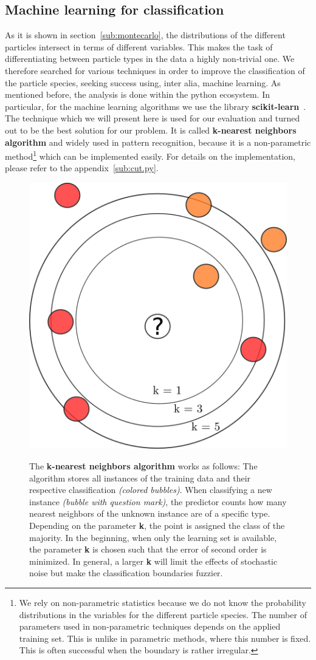 \clearpage

\subsection{Machine learning for classification}
As it is shown in section~\ref{sub:montecarlo},
the distributions of the different particles intersect in terms of different
variables. This makes the task of differentiating between particle types in the 
data a highly non-trivial one. We therefore searched for various techniques in order
to improve the classification of the particle species, seeking success using, inter alia, machine learning. 
As mentioned before, the analysis is done within the python
ecosystem. In particular, for the machine learning algorithms we use the library 
\textbf{scikit-learn}~\cite{scikit-learn}. 
The technique which we will present
here is used for our evaluation and turned out to be the best solution for our problem.
It is called \textbf{k-nearest neighbors algorithm} and
widely used in pattern recognition, because it is a non-parametric method\footnote{
We rely on non-parametric statistics because we do not know the probability distributions 
in the variables for the different particle species.
The number of parameters used in non-parametric techniques depends on the applied training set. 
This is unlike in parametric methods, where this number is fixed. This is often successful when the boundary is rather irregular.} 
which can be implemented easily. For details on the implementation, please refer to the appendix~\ref{sub:cut.py}.
\begin{figure}
    \centering
    \caption{The \textbf{k-nearest neighbors algorithm} works as follows: 
        The algorithm stores all instances of the training data and their respective
    classification \textit{(colored bubbles)}. When classifying a new instance \textit{(bubble with question mark)}, the 
    predictor counts how many nearest neighbors of the unknown instance are of a specific type. 
    Depending on the parameter \textbf{k}, the point is assigned the class of the majority. 
    In the beginning, when only the learning set is available,
    the parameter \textbf{k} is chosen such that the error of second order is minimized. In general, a larger \textbf{k} will
    limit the effects of stochastic noise but make the classification boundaries fuzzier.}
    \includegraphics[width=0.5\linewidth]{figures/knn_schema}
\label{fig:knn_schema}
\end{figure}

